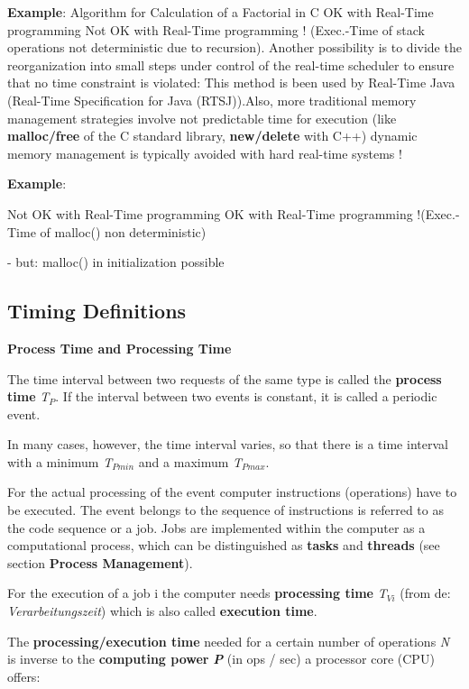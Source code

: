 \textbf{Example}: Algorithm for Calculation of a Factorial in C OK with Real-Time programming      Not OK with Real-Time programming ! (Exec.-Time of stack operations not deterministic due to recursion). Another possibility is to divide the reorganization into small steps under control of the real-time scheduler to ensure that no time constraint is violated: This method is been used by Real-Time Java (Real-Time Specification for Java (RTSJ)).Also, more traditional memory management strategies involve not predictable time for execution (like \textbf{malloc/free} of the C standard library, \textbf{new/delete} with C++)  dynamic memory management is typically avoided with hard real-time systems !

\textbf{Example}:

Not OK with Real-Time programming     OK with Real-Time programming !(Exec.-Time of malloc() non deterministic)

- but: malloc() in initialization possible  

\subsection{  Timing Definitions}

\textbf{Process Time and Processing Time}

The time interval between two requests of the same type is called the \textbf{process time} \textit{T${}_{P}$}. If the interval between two events is constant, it is called a periodic event. 

In many cases, however, the time interval varies, so that there is a time interval with a minimum \textit{T${}_{Pmin}$} and a maximum \textit{T${}_{Pmax}$}.

For the actual processing of the event computer instructions (operations) have to be executed. The event belongs to the sequence of instructions is referred to as the code sequence or a job. Jobs are implemented within the computer as a computational process, which can be distinguished as \textbf{tasks} and \textbf{threads} (see section \textbf{Process Management}). 

For the execution of a job i the computer needs \textbf{processing time} \textit{T${}_{Vi}$} (from de: \textit{Verarbeitungszeit}) which is also called \textbf{execution time}.

The \textbf{processing/execution time }needed for a certain number of operations \textit{N} is inverse to the \textbf{computing power} \textbf{\textit{P}} (in ops / sec) a processor core (CPU) offers:

